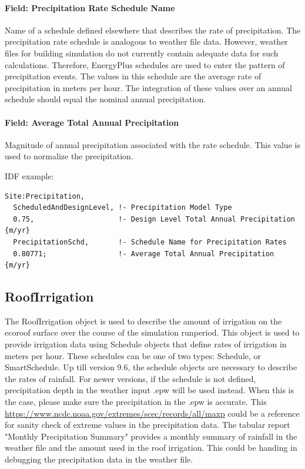 \paragraph{Field: Precipitation Rate Schedule Name}\label{field-precipitation-rate-schedule-name}

Name of a schedule defined elsewhere that describes the rate of precipitation. The precipitation rate schedule is analogous to weather file data. However, weather files for building simulation do not currently contain adequate data for such calculations. Therefore, EnergyPlus schedules are used to enter the pattern of precipitation events. The values in this schedule are the average rate of precipitation in meters per hour. The integration of these values over an annual schedule should equal the nominal annual precipitation.

\paragraph{Field: Average Total Annual Precipitation}\label{field-average-total-annual-precipitation}

Magnitude of annual precipitation associated with the rate schedule. This value is used to normalize the precipitation.

IDF example:

\begin{lstlisting}
Site:Precipitation,
  ScheduledAndDesignLevel, !- Precipitation Model Type
  0.75,                    !- Design Level Total Annual Precipitation {m/yr}
  PrecipitationSchd,       !- Schedule Name for Precipitation Rates
  0.80771;                 !- Average Total Annual Precipitation {m/yr}
\end{lstlisting}

\subsection{RoofIrrigation}\label{roofirrigation}

The RoofIrrigation object is used to describe the amount of irrigation on the ecoroof surface over the course of the simulation runperiod. This object is used to provide irrigation data using Schedule objects that define rates of irrigation in meters per hour. These schedules can be one of two types: Schedule, or SmartSchedule. Up till version 9.6, the schedule objects are necessary to describe the rates of rainfall. For newer versions, if the schedule is not defined, precipitation depth in the weather input .epw will be used instead. When this is the case, please make sure the precipitation in the .epw is accurate. This \href{table by the State Climate Extreme Committee}{https://www.ncdc.noaa.gov/extremes/scec/records/all/maxp} could be a reference for sanity check of extreme values in the precipitation data. The tabular report "Monthly Precipitation Summary" provides a monthly summary of rainfall in the weather file and the amount used in the roof irrigation. This could be handing in debugging the precipitation data in the weather file.

